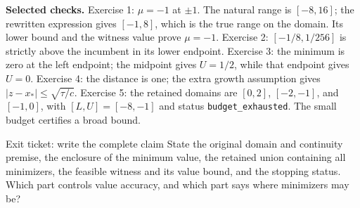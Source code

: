 \textbf{Selected checks.} Exercise 1: $\mu=-1$ at $\pm1$.
The natural range is $[-8,16]$; the rewritten expression gives $[-1,8]$,
which is the true range on the domain. Its lower bound and the witness
value prove $\mu=-1$. Exercise 2: $[-1/8,1/256]$ is strictly above the
incumbent in its lower endpoint. Exercise 3: the minimum is zero at the
left endpoint; the midpoint gives $U=1/2$, while that endpoint gives
$U=0$. Exercise 4: the distance is one; the extra growth assumption gives
$|z-x_*|\le\sqrt{\tau/c}$. Exercise 5: the retained domains are
$[0,2]$, $[-2,-1]$, and $[-1,0]$, with $[L,U]=[-8,-1]$ and status
\texttt{budget\_exhausted}. The small budget certifies a broad bound.

\begin{question}{Exit ticket: write the complete claim}
State the original domain and continuity premise, the enclosure of the
minimum value, the retained union containing all minimizers, the feasible
witness and its value bound, and the stopping status. Which part controls
value accuracy, and which part says where minimizers may be?
\end{question}


